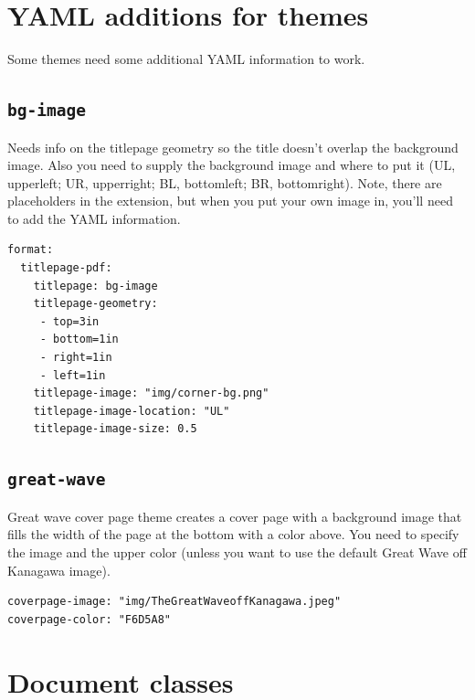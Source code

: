 \documentclass[
  oneside,
  open=any]{scrbook}
\begin{document}
\hypertarget{yaml-additions-for-themes}{%
\section{YAML additions for themes}\label{yaml-additions-for-themes}}

Some themes need some additional YAML information to work.

\hypertarget{bg-image}{%
\subsection{\texorpdfstring{\texttt{bg-image}}{bg-image}}\label{bg-image}}

Needs info on the titlepage geometry so the title doesn't overlap the
background image. Also you need to supply the background image and where
to put it (UL, upperleft; UR, upperright; BL, bottomleft; BR,
bottomright). Note, there are placeholders in the extension, but when
you put your own image in, you'll need to add the YAML information.

\begin{verbatim}
format: 
  titlepage-pdf:
    titlepage: bg-image
    titlepage-geometry: 
     - top=3in
     - bottom=1in
     - right=1in
     - left=1in
    titlepage-image: "img/corner-bg.png"
    titlepage-image-location: "UL"
    titlepage-image-size: 0.5
\end{verbatim}

\hypertarget{great-wave}{%
\subsection{\texorpdfstring{\texttt{great-wave}}{great-wave}}\label{great-wave}}

Great wave cover page theme creates a cover page with a background image
that fills the width of the page at the bottom with a color above. You
need to specify the image and the upper color (unless you want to use
the default Great Wave off Kanagawa image).

\begin{verbatim}
coverpage-image: "img/TheGreatWaveoffKanagawa.jpeg"
coverpage-color: "F6D5A8"
\end{verbatim}

\hypertarget{document-classes}{%
\section{Document classes}\label{document-classes}}
\end{document}
